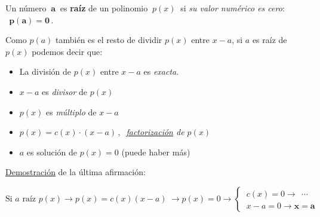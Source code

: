 \begin{definition} 

Un número $\ \boldsymbol a \ $ es \textbf{raíz}	 de un polinomio $\ p(x)\ $ si \emph{su valor numérico es cero}: $\ \ \boldsymbol{p(a)=0}\, . \ $ 

\vspace{2mm} Como $p(a)$ también es el resto de dividir $p(x)$ entre $x-a$, si $a$ es raíz de $p(x)$ podemos decir que:

\begin{itemize}
\vspace{-2mm}\item La división de $p(x)$ entre $x-a$ es \emph{exacta}.
\vspace{-2mm}\item $x-a$ es \emph{divisor} de $p(x)$ 
\vspace{-2mm}\item $p(x)$ es \emph{múltiplo} de $x-a$
\vspace{-2mm} \item $p(x)=c(x)\cdot (x-a)\, , \  $ \emph{\underline{factorización} de $p(x)$} 
\vspace{-2mm}\item $a$ es solución de $p(x)=0$ (puede haber más)
\end{itemize}

\end{definition}


\color{gris} \underline{Demostración} de la última afirmación:

$\text{Si }a \text{ raíz } p(x) \to p(x)=c(x)(x-a) \ \to p(x)=0 \to \begin{cases}
 \ c(x)=0 \to \ \ \cdots \\ \ x-a=0 \to \boldsymbol{x=a} 	
 \end{cases}$ \QED

\color{black}


